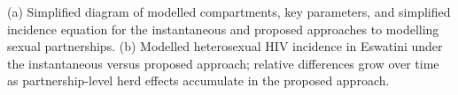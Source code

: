 (a) Simplified diagram of modelled compartments, key parameters, and simplified incidence equation
for the instantaneous and proposed approaches to modelling sexual partnerships.
(b) Modelled heterosexual HIV incidence in Eswatini under the instantaneous versus proposed approach;
relative differences grow over time
as partnership-level herd effects accumulate in the proposed approach.
